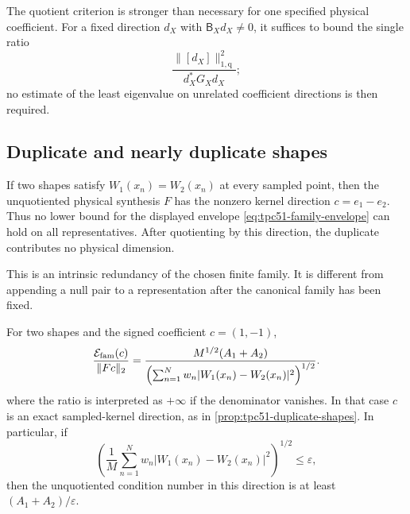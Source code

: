 The quotient criterion is stronger than necessary for one specified
physical coefficient.  For a fixed direction \(d_X\) with
\(\mathsf B_Xd_X\ne0\), it suffices to bound the single ratio
\begin{equation}
 \frac{\|[d_X]\|_{1,\mathrm q}^2}
      {d_X^*G_Xd_X};
 \label{eq:tpc51-one-direction-Rayleigh}
\end{equation}
no estimate of the least eigenvalue on unrelated coefficient directions
is then required.

\subsection{Duplicate and nearly duplicate shapes}

\begin{proposition}
\label{prop:tpc51-duplicate-shapes}
If two shapes satisfy \(W_1(x_n)=W_2(x_n)\) at every sampled point,
then the unquotiented physical synthesis \(F\) has the nonzero kernel
direction \(c=e_1-e_2\).  Thus no lower bound for the displayed
envelope \eqref{eq:tpc51-family-envelope} can hold on all
representatives.  After quotienting by this direction, the duplicate
contributes no physical dimension.
\end{proposition}

This is an intrinsic redundancy of the chosen finite family.  It is
different from appending a null pair to a representation after the
canonical family has been fixed.

\begin{proposition}
\label{prop:tpc51-near-duplicate-shapes}
For two shapes and the signed coefficient \(c=(1,-1)\),
\begin{equation}
 \frac{\mathcal E_{\mathrm{fam}}(c)}{\|Fc\|_2}
 =\frac{M^{1/2}(A_1+A_2)}
 {\left(\sum_{n=1}^Nw_n
       |W_1(x_n)-W_2(x_n)|^2\right)^{1/2}}.
 \label{eq:tpc51-near-duplicate-exact}
\end{equation}
where the ratio is interpreted as \(+\infty\) if the denominator
vanishes.  In that case \(c\) is an exact sampled-kernel direction, as
in \cref{prop:tpc51-duplicate-shapes}.
In particular, if
\begin{equation}
 \left(\frac1M\sum_{n=1}^Nw_n
 |W_1(x_n)-W_2(x_n)|^2\right)^{1/2}
 \le\varepsilon,
 \label{eq:tpc51-near-duplicate-distance}
\end{equation}
then the unquotiented condition number in this direction is at least
\((A_1+A_2)/\varepsilon\).
\end{proposition}

